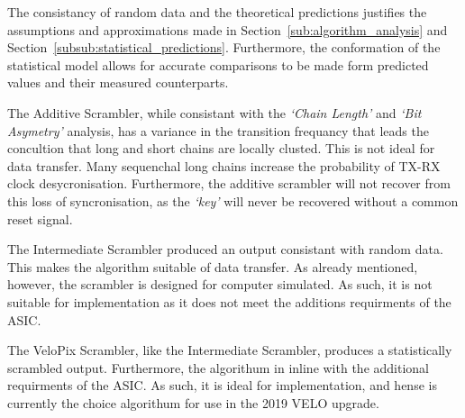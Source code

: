  		The consistancy of random data and the theoretical predictions justifies the assumptions and approximations made in Section~\ref{sub:algorithm_analysis} and Section~\ref{subsub:statistical_predictions}. 
 		Furthermore, the conformation of the statistical model allows for accurate comparisons to be made form predicted values and their measured counterparts.		
 		\par		
 		The Additive Scrambler, while consistant with the \textit{`Chain Length'} and \textit{`Bit Asymetry'} analysis, has a variance in the transition frequancy that leads the concultion that long and short chains are locally clusted. 		
 		This is not ideal for data transfer. 		
 		Many sequenchal long chains increase the probability of TX-RX clock desycronisation. 		
 		Furthermore, the additive scrambler will not recover from this loss of syncronisation, as the \textit{`key'} will never be recovered without a common reset signal.		
 		\par		
 		The Intermediate Scrambler produced an output consistant with random data. 		
 		This makes the algorithm suitable of data transfer.		
 		As already mentioned, however, the scrambler is designed for computer simulated.		
 		As such, it is not suitable for implementation as it does not meet the additions requirments of the ASIC.		
 		\par		
 		The VeloPix Scrambler, like the Intermediate Scrambler, produces a statistically scrambled output.		
 		Furthermore, the algorithum in inline with the additional requirments of the ASIC.		
 		As such, it is ideal for implementation, and hense is currently the choice algorithum for use in the 2019 VELO upgrade.